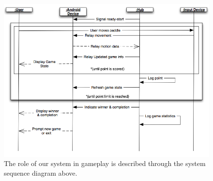 \documentclass[12pt]{article}
\begin{document}
\begin{figure}
\begin{center}
\includegraphics[scale=.5]{ssd_GamePlay_1.png}
\caption{\label{ssd_GamePlay_1}The role of our system in gameplay is 
  described through the system sequence diagram above.}
\end{center}
\end{figure}
\end{document}
